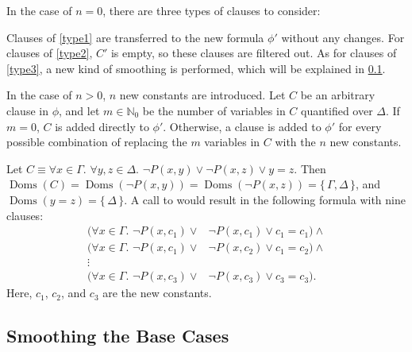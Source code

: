 \documentclass[a4paper,UKenglish,cleveref, autoref, thm-restate]{lipics-v2021}
\DeclareMathOperator{\Doms}{Doms}
\begin{document}
In the case of $n = 0$, there are three types of clauses to consider:
Clauses of \cref{type1} are transferred to the new formula $\phi'$ without any
changes. For clauses of \cref{type2}, $C'$ is empty, so these clauses are
filtered out. As for clauses of \cref{type3}, a new kind of smoothing is
performed, which will be explained in \cref{sec:smoothing}.

In the case of $n>0$, $n$ new constants are introduced. Let $C$ be an arbitrary
clause in $\phi$, and let $m \in \mathbb{N}_{0}$ be the number of variables in
$C$ quantified over $\Delta$. If $m=0$, $C$ is added directly to $\phi'$.
Otherwise, a clause is added to $\phi'$ for every possible combination of
replacing the $m$ variables in $C$ with the $n$ new constants.

\begin{example}
  Let $C \equiv \forall x \in \Gamma\text{. }\forall y, z \in \Delta\text{.
  } \neg P(x, y) \lor \neg P(x, z) \lor y=z$. Then
  $\Doms(C) = \Doms(\neg P(x, y)) = \Doms(\neg P(x, z)) = \{\, \Gamma, \Delta \,\}$,
  and $\Doms(y=z) = \{\, \Delta \,\}$. A call to  would result in the following formula with nine clauses:
  \begin{align*}
    (\forall x \in \Gamma\text{. }\neg P(x, c_{1}) \lor& \neg P(x, c_{1}) \lor c_{1}=c_{1})\land{}\\
    (\forall x \in \Gamma\text{. }\neg P(x, c_{1}) \lor& \neg P(x, c_{2}) \lor c_{1}=c_{2})\land{}\\
    \vdots&\\
    (\forall x \in \Gamma\text{. }\neg P(x, c_{3}) \lor& \neg P(x, c_{3}) \lor c_{3}=c_{3}).
  \end{align*}
  Here, $c_{1}$, $c_{2}$, and $c_{3}$ are the new constants.
\end{example}

\subsection{Smoothing the Base Cases}\label{sec:smoothing}
\end{document}
